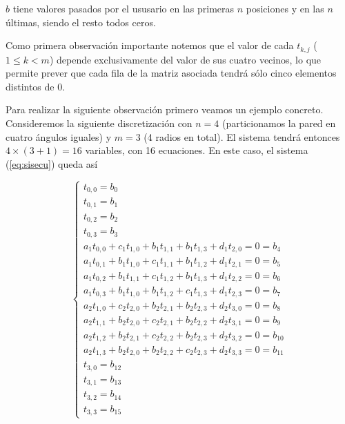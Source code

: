 $b$ tiene valores pasados por el ususario en las primeras $n$ posiciones y en las $n$ últimas, siendo el resto todos ceros.

Como primera observación importante notemos que el valor de cada $t_{k,j}$ ($1\leq k < m$) depende exclusivamente del valor de sus cuatro vecinos, lo que permite prever que cada fila de la matriz asociada tendrá sólo cinco elementos distintos de 0.

Para realizar la siguiente observación primero veamos un ejemplo concreto. Consideremos la siguiente discretización con $n = 4$ (particionamos la pared en cuatro ángulos iguales) y $m = 3$ (4 radios en total). El sistema tendrá entonces $4\times (3+1) = 16$ variables, con 16 ecuaciones. En este caso, el sistema (\ref{eq:sisecu}) queda así

\begin{equation}
\label{ej16x16}
  \left\lbrace
  \begin{array}{l}
     t_{0,0} = b_0 \\
     t_{0,1} = b_1 \\
     t_{0,2} = b_2 \\
     t_{0,3} = b_3 \\
		 a_1 t_{0,0} + c_1 t_{1,0} + b_1 t_{1, 1} + b_1 t_{1, 3} + d_1 t_{2,0} 		= 0 = b_{4}	\\
		 a_1 t_{0,1} + b_1 t_{1,0} + c_1 t_{1,1} + b_1 t_{1,2} + d_1 t_{2,1} 		 	= 0 = b_{5}	\\
	   a_1 t_{0,2} + b_1 t_{1,1} + c_1 t_{1,2} + b_1 t_{1,3} + d_1 t_{2,2} 			= 0 = b_{6}	\\
		 a_1 t_{0,3} + b_1 t_{1,0} + b_1 t_{1,2} + c_1 t_{1,3} + d_1 t_{2,3} 			= 0 = b_{7}	\\
		 a_2 t_{1,0} + c_2 t_{2,0} + b_2 t_{2,1} + b_2 t_{2,3} + d_2 t_{3,0}			= 0 = b_{8}	\\
		 a_2 t_{1,1} + b_2 t_{2,0} + c_2 t_{2,1} + b_2 t_{2,2} + d_2 t_{3,1} 		 	= 0 = b_{9}	\\
	   a_2 t_{1,2} + b_2 t_{2,1} + c_2 t_{2,2} + b_2 t_{2,3} + d_2 t_{3,2} 			= 0 = b_{10}	\\
		 a_2 t_{1,3} + b_2 t_{2,0} + b_2 t_{2,2} + c_2 t_{2,3} + d_2 t_{3,3} 			= 0 = b_{11}	\\
     t_{3,0} = b_{12} \\
     t_{3,1} = b_{13} \\
     t_{3,2} = b_{14} \\
     t_{3,3} = b_{15}     		 
  \end{array}
  \right.
\end{equation}

